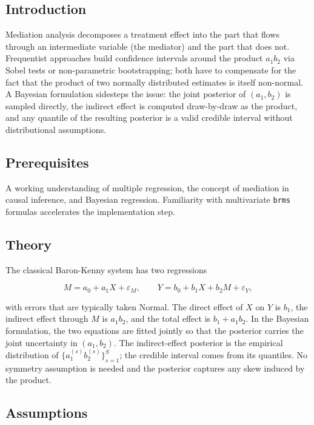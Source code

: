 \documentclass[
]{article}
\author{}
\date{\vspace{-2.5em}}
\begin{document}
\subsection{Introduction}\label{introduction}

Mediation analysis decomposes a treatment effect into the part that
flows through an intermediate variable (the mediator) and the part that
does not. Frequentist approaches build confidence intervals around the
product \(a_1 b_2\) via Sobel tests or non-parametric bootstrapping;
both have to compensate for the fact that the product of two normally
distributed estimates is itself non-normal. A Bayesian formulation
sidesteps the issue: the joint posterior of \((a_1, b_2)\) is sampled
directly, the indirect effect is computed draw-by-draw as the product,
and any quantile of the resulting posterior is a valid credible interval
without distributional assumptions.

\subsection{Prerequisites}\label{prerequisites}

A working understanding of multiple regression, the concept of mediation
in causal inference, and Bayesian regression. Familiarity with
multivariate \texttt{brms} formulas accelerates the implementation step.

\subsection{Theory}\label{theory}

The classical Baron-Kenny system has two regressions

\[M = a_0 + a_1 X + \varepsilon_M, \qquad Y = b_0 + b_1 X + b_2 M + \varepsilon_Y,\]

with errors that are typically taken Normal. The direct effect of \(X\)
on \(Y\) is \(b_1\), the indirect effect through \(M\) is \(a_1 b_2\),
and the total effect is \(b_1 + a_1 b_2\). In the Bayesian formulation,
the two equations are fitted jointly so that the posterior carries the
joint uncertainty in \((a_1, b_2)\). The indirect-effect posterior is
the empirical distribution of \(\{a_1^{(s)} b_2^{(s)}\}_{s=1}^S\); the
credible interval comes from its quantiles. No symmetry assumption is
needed and the posterior captures any skew induced by the product.

\subsection{Assumptions}\label{assumptions}
\end{document}
